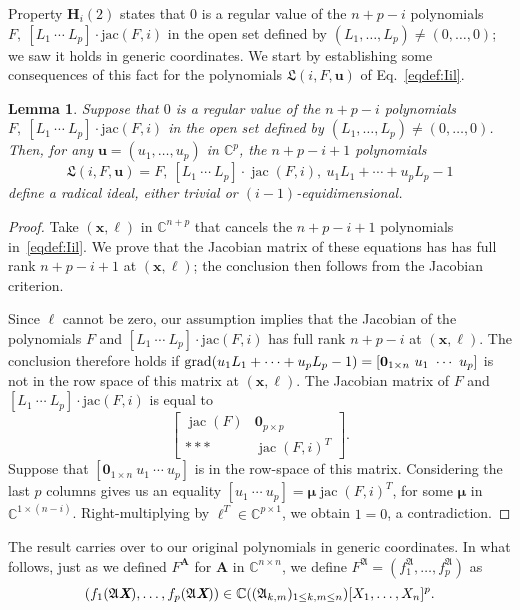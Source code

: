 \documentclass[12pt]{article}
\def\frkL{\mathfrak{L}}
\def\A{\mathfrak{A}}
\def\Xb{\textit{\textbf{X}}}
\def\mA{{\bm A}}
\def\ub{{\bm u}}
\def\xb{{\bm x}}
\DeclareMathOperator{\jac}{jac}
\def\C{\mathbb{C}}
\newtheorem{lemma}[theorem]{Lemma}
\begin{document}
Property ${\bm H}_i(2)$ states that $0$ is a regular value of the
$n+p-i$ polynomials $F,\ [L_1~\cdots~L_p]\cdot \mathrm {jac}(F,i)$ in
the open set defined by $(L_1,\dots,L_p) \ne (0,\dots,0)$; we saw it
holds in generic coordinates. We start by establishing some
consequences of this fact for the polynomials ${\frkL}(i, F, \bm u)$
of Eq.~\eqref{eqdef:Iil}.
\begin{lemma}\label{prop:RadLagPolarV}
  Suppose that $0$ is a regular value of the $n+p-i$ polynomials
  $F,\ [L_1~\cdots~L_p]\cdot \mathrm {jac}(F,i)$ in the open set
  defined by $(L_1,\dots,L_p) \ne (0,\dots,0)$. Then, for any $\ub =
  (u_1,\hdots,u_p)$ in $\C^p$, the $n+p-i+1$ polynomials
  \begin{equation*}
    {\frkL}(i, F, \bm u) = F,\ [L_1~\cdots~L_p]\cdot \jac(F, i),\ u_1 L_1 + \cdots + u_p L_p -1
  \end{equation*}
  define a radical ideal, either trivial or $(i-1)$-equidimensional.
\end{lemma}
\begin{proof}
  Take $(\xb,\bm \ell)$ in $\C^{n+p}$ that cancels the $n+p-i+1$
  polynomials in~\eqref{eqdef:Iil}. We prove that the Jacobian matrix
  of these equations has has full rank $n+p-i+1$ at $(\xb,\bm\ell)$;
  the conclusion then follows from the Jacobian criterion.

  Since $\bm\ell$ cannot be zero, our assumption implies that the
  Jacobian of the polynomials $F$ and $[L_1~\cdots~L_p]\cdot \mathrm
  {jac}(F,i)$ has full rank $n+p-i$ at $(\xb,\bm\ell)$. The conclusion
  therefore holds if ${\rm grad}(u_1 L_1 + \cdots + u_p L_p-1) = [
    {\bm 0}_{1 \times n} ~ u_1~ \cdots ~u_p ]$ is not in the row space
  of this matrix at $(\xb,\bm\ell)$. The Jacobian matrix of $F$ and
  $[L_1~\cdots~L_p]\cdot \mathrm {jac}(F,i)$ is equal to
  \[
  \left[ 
    \begin{array}{cc}
      \jac(F) & {\bm 0}_{p \times p}\\
     *** &  \jac(F,i)^T 
    \end{array}
    \right].
  \]
  Suppose that $[ {\bm 0}_{1 \times n} ~ u_1~ \cdots ~u_p]$ is in the
  row-space of this matrix. Considering the last $p$ columns gives us
  an equality $[u_1 ~ \cdots ~ u_p] = \bm \mu \jac(F,i)^T $, for
  some $\bm \mu$ in $\C^{1 \times (n-i)}$. Right-multiplying by $\bm
  \ell^T \in \C^{p \times 1}$, we obtain $1 = 0$, a contradiction.
\end{proof}

The result carries over to our original polynomials in generic
coordinates. In what follows, just as we defined $F^\mA$ for $\mA$ in
$\C^{n\times n}$, we define $F^{\A}=(f_1^{\A},\hdots,f_p^{\A})$
as \[(f_1(\A\Xb),\hdots,f_p(\A\Xb)) \in \C((\A_{k,m})_{1 \le k,m \le
  n})[X_1,\dots,X_n]^p.\]
\end{document}
